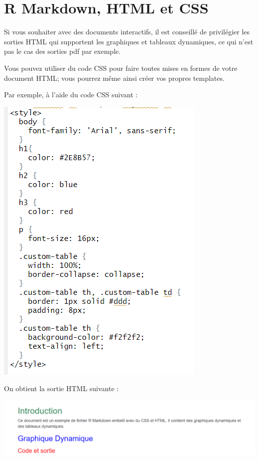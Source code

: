 \documentclass[
  12pt,
]{article}
\begin{document}
\newpage

\section{R Markdown, HTML et CSS}\label{r-markdown-html-et-css}

Si vous souhaiter avec des documents interactifs, il est conseillé de
privilégier les sorties HTML qui supportent les graphiques et tableaux
dynamiques, ce qui n'est pas le cas des sorties pdf par exemple.

Vous pouvez utiliser du code CSS pour faire toutes mises en formes de
votre document HTML; vous pourrez même ainsi créer vos propres
templates.

Par exemple, à l'aide du code CSS suivant :

\begin{center}\includegraphics[width=0.5\linewidth,height=0.5\textheight]{../Document_Rmarkdown/code_CSS} \end{center}

On obtient la sortie HTML suivante :

\begin{center}\includegraphics[width=1\linewidth,height=1\textheight]{../Document_Rmarkdown/Sortie_code_CSS} \end{center}
\end{document}
